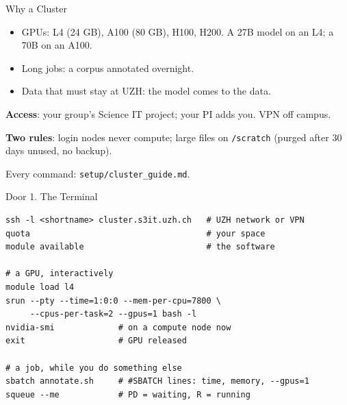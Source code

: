 \documentclass[svgnames,x11names,dvipsnames]{beamer}
\begin{document}
\begin{frame}{Why a Cluster}
\small
\begin{itemize}
    \setlength{\itemsep}{6pt}
    \item GPUs: L4 (24 GB), A100 (80 GB), H100, H200. A 27B model on an L4; a 70B on an A100.
    \item Long jobs: a corpus annotated overnight.
    \item Data that must stay at UZH: the model comes to the data.
\end{itemize}

\vspace{0.5cm}
\textbf{Access}: your group's Science IT project; your PI adds you. VPN off campus.

\vspace{0.3cm}
\textbf{Two rules}: login nodes never compute; large files on \texttt{/scratch} (purged after 30 days unused, no backup).

\vspace{0.4cm}
{\footnotesize Every command: \texttt{setup/cluster\_guide.md}.}
\end{frame}

\begin{frame}[fragile]{Door 1. The Terminal}
\vspace{0.1cm}
{\scriptsize
\begin{verbatim}
ssh -l <shortname> cluster.s3it.uzh.ch   # UZH network or VPN
quota                                    # your space
module available                         # the software

# a GPU, interactively
module load l4
srun --pty --time=1:0:0 --mem-per-cpu=7800 \
     --cpus-per-task=2 --gpus=1 bash -l
nvidia-smi             # on a compute node now
exit                   # GPU released

# a job, while you do something else
sbatch annotate.sh     # #SBATCH lines: time, memory, --gpus=1
squeue --me            # PD = waiting, R = running
\end{verbatim}}
\end{frame}
\end{document}
